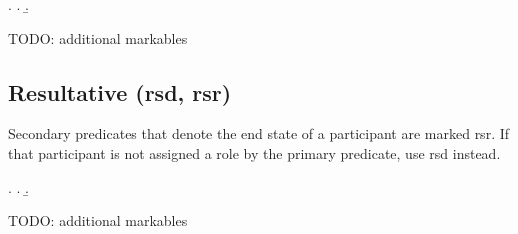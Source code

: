 \documentclass[a4paper]{article}
\begin{document}
\ex.
\a. 
\b. 

TODO: additional markables


\clearpage
\subsection{Resultative (\textsf{rsd}, \textsf{rsr})}
\label{sec:rsd}\label{sec:rsr}

Secondary predicates that denote the end state of a participant are marked
\textsf{rsr}. If that participant is not assigned a role by the primary
predicate, use \textsf{rsd} instead.

\ex.
\a. 
\b. 

TODO: additional markables

\appendix

\end{document}
